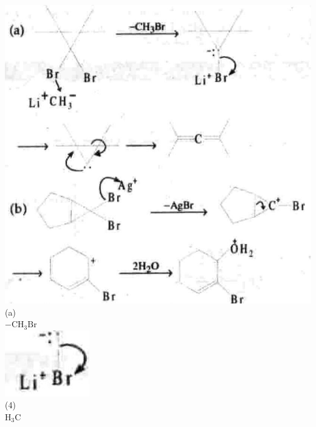 \documentclass[10pt]{article}
\begin{document}
\includegraphics[max width=\textwidth, center]{2025_01_28_8470952b98110cec3aabg-247(10)}\\
(a)\\
 $-\mathrm{CH}_{3} \mathrm{Br}$\\
\includegraphics[max width=\textwidth, center]{2025_01_28_8470952b98110cec3aabg-247}\\
(4)\\
$\mathrm{H}_{3} \mathrm{C}$\\
\end{document}

